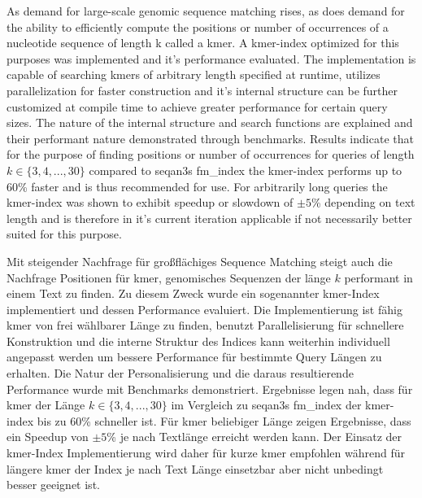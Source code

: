 \begin{abstractEN}
As demand for large-scale genomic sequence matching rises, as does
demand for the ability to efficiently compute the positions or number of occurrences
of a nucleotide sequence of length k called a kmer. A kmer-index optimized for this
purposes was implemented and it's performance evaluated. The implementation
is capable of searching kmers of arbitrary length specified at runtime,
utilizes parallelization for faster construction and it's internal
structure can be further customized at compile time to achieve greater
performance for certain query sizes. The nature of the internal structure
and search functions are explained and their performant nature demonstrated
through benchmarks. Results indicate that for the purpose of finding
positions or number of occurrences for queries of
length $k\in\{3,4,...,30\}$ compared to seqan3s fm\_index the kmer-index
performs up to 60\% faster and is thus recommended for use. For arbitrarily
long queries the kmer-index was shown to exhibit speedup or slowdown
of $\pm5$\% depending on text length and is therefore in it's current
iteration applicable if not necessarily better suited for this purpose.
\end{abstractEN}
\vfill

\begin{abstractDE}
Mit steigender Nachfrage f\"ur gro\ss fl\"achiges Sequence Matching steigt
auch die Nachfrage Positionen f\"ur kmer, genomisches Sequenzen der länge $k$ performant
in einem Text zu finden. Zu diesem Zweck wurde ein sogenannter kmer-Index implementiert
und dessen Performance evaluiert. Die Implementierung ist f\"ahig kmer von frei w\"ahlbarer
L\"ange zu finden, benutzt Parallelisierung f\"ur schnellere Konstruktion und die interne
Struktur des Indices kann weiterhin individuell angepasst werden um bessere Performance
f\"ur bestimmte Query L\"angen zu erhalten. Die Natur der Personalisierung und die daraus
resultierende Performance wurde mit Benchmarks demonstriert. Ergebnisse legen nah, 
dass f\"ur kmer der L\"ange $k\in\{3,4,...,30\}$ im Vergleich zu seqan3s fm\_index der 
kmer-index bis zu 60\% schneller ist. F\"ur kmer beliebiger L\"ange zeigen Ergebnisse, 
dass ein Speedup von $\pm5$\% je nach Textl\"ange erreicht werden kann. Der Einsatz der kmer-Index
Implementierung wird daher f\"ur kurze kmer empfohlen w\"ahrend f\"ur l\"angere kmer der Index 
je nach Text L\"ange einsetzbar aber nicht unbedingt besser geeignet ist.
\end{abstractDE}
\vfill

